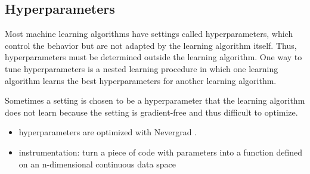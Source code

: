 \documentclass{scrartcl}
\begin{document}

\subsection{Hyperparameters}

Most machine learning algorithms have settings called hyperparameters, which control the behavior but are not adapted by the learning algorithm itself. Thus, hyperparameters must be determined outside the learning algorithm. One way to tune hyperparameters is a nested learning procedure in which one learning algorithm learns the best hyperparameters for another learning algorithm. 

Sometimes a setting is chosen to be a hyperparameter that the learning algorithm does not learn because the setting is gradient-free and thus difficult to optimize.  


\begin{itemize}
\item hyperparameters are optimized with Nevergrad \cite{nevergrad}.
\item instrumentation: turn a piece of code with parameters into a function defined on an n-dimensional continuous data space
\end{itemize}



\end{document}
